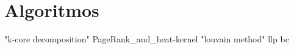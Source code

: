 \chapter{Algoritmos}

{"k-core decomposition"}
{PageRank_and_heat-kernel}
{"louvain method"}
{llp}
{bc}
